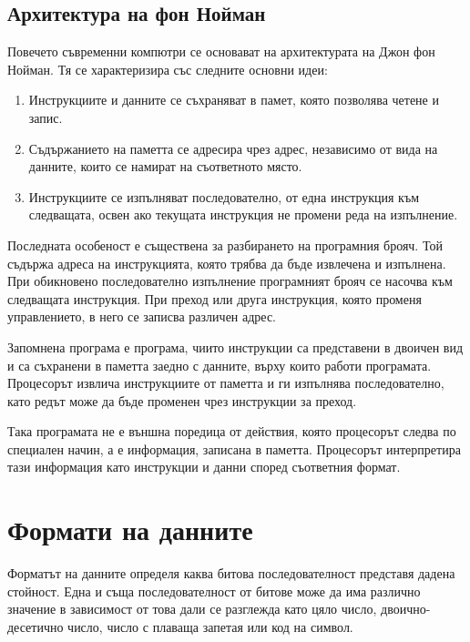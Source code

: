 \subsection{Архитектура на фон Нойман}\label{s:9.1.1}

Повечето съвременни компютри се основават на архитектурата на Джон фон Нойман. Тя се характеризира със следните основни идеи:

\begin{enumerate}
    \item Инструкциите и данните се съхраняват в памет, която позволява четене и запис.
    \item Съдържанието на паметта се адресира чрез адрес, независимо от вида на данните, които се намират на съответното място.
    \item Инструкциите се изпълняват последователно, от една инструкция към следващата, освен ако текущата инструкция не промени реда на изпълнение.
\end{enumerate}

Последната особеност е съществена за разбирането на програмния брояч. Той съдържа адреса на инструкцията, която трябва да бъде извлечена и изпълнена. При обикновено последователно изпълнение програмният брояч се насочва към следващата инструкция. При преход или друга инструкция, която променя управлението, в него се записва различен адрес.

\begin{defn}
Запомнена програма е програма, чиито инструкции са представени в двоичен вид и са съхранени в паметта заедно с данните, върху които работи програмата. Процесорът извлича инструкциите от паметта и ги изпълнява последователно, като редът може да бъде променен чрез инструкции за преход.
\end{defn}

Така програмата не е външна поредица от действия, която процесорът следва по специален начин, а е информация, записана в паметта. Процесорът интерпретира тази информация като инструкции и данни според съответния формат.

\section{Формати на данните}\label{s:9.2}

\begin{defn}
Форматът на данните определя каква битова последователност представя дадена стойност. Една и съща последователност от битове може да има различно значение в зависимост от това дали се разглежда като цяло число, двоично-десетично число, число с плаваща запетая или код на символ.
\end{defn}

